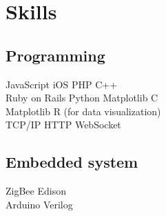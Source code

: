 \documentclass[letterpaper]{deedy-resume} %
\begin{document}
\begin{minipage}[t]{0.33\textwidth}
\sectionspace %


\section{Skills}

\subsection{Programming}

JavaScript \textbullet{} iOS \textbullet{} PHP \textbullet{} C++  \\
Ruby on Rails \textbullet{} Python \textbullet{} Matplotlib \textbullet{} C \\
Matplotlib \textbullet{} R (for data visualization) \\
TCP/IP \textbullet{} HTTP \textbullet{} WebSocket

\vspace{2mm}

\subsection{Embedded system}
ZigBee \textbullet{} Edison \\
Arduino \textbullet{}  Verilog

\sectionspace %


\end{minipage} %
\hfill
%
%
\end{document}
